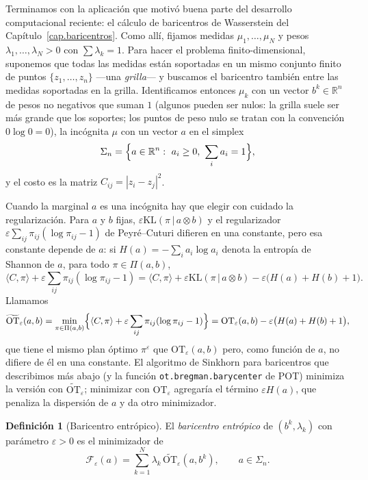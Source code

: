 \documentclass[12pt, a4paper]{amsbook}
\newcommand{\R}{{\mathbb R}}
\theoremstyle{remark}
\theoremstyle{definition}
\newtheorem{defi}[teo]{Definición}
\numberwithin{section}{chapter}
\numberwithin{subsection}{section}
\numberwithin{equation}{section}
\numberwithin{figure}{chapter}
\begin{document}
Terminamos con la aplicación que motivó buena parte del desarrollo
computacional reciente: el cálculo de baricentros de Wasserstein del
Capítulo~\ref{cap.baricentros}. Como allí, fijamos medidas $\mu_1,\dots,\mu_N$
y pesos $\lambda_1,\dots,\lambda_N>0$ con $\sum\lambda_k=1$. Para hacer el
problema finito-dimensional, suponemos que todas las medidas están
soportadas en un mismo conjunto finito de puntos $\{z_1,\dots,z_n\}$ —una
\emph{grilla}— y buscamos el baricentro también entre las medidas soportadas
en la grilla. Identificamos entonces $\mu_k$ con un vector $b^k\in\R^n$
de pesos no negativos que suman $1$ (algunos pueden ser nulos: la grilla
suele ser más grande que los soportes; los puntos de peso nulo se tratan
con la convención $0\log0=0$), la incógnita $\mu$ con un vector $a$ en el simplex
\[
\Sigma_n=\Bigl\{a\in\R^n:\ a_i\ge0,\ \sum_ia_i=1\Bigr\},
\]
y el costo es la matriz $C_{ij}=|z_i-z_j|^2$.

Cuando la marginal $a$ es una incógnita hay que elegir con cuidado la
regularización. Para $a$ y $b$ fijas, $\varepsilon\mathrm{KL}(\pi\,|\,a\otimes b)$
y el regularizador $\varepsilon\sum_{ij}\pi_{ij}(\log\pi_{ij}-1)$ de
Peyré--Cuturi difieren en una constante, pero esa constante depende de $a$:
si $H(a)=-\sum_ia_i\log a_i$ denota la entropía de Shannon de $a$, para todo
$\pi\in\Pi(a,b)$,
\[
\langle C,\pi\rangle+\varepsilon\sum_{ij}\pi_{ij}(\log\pi_{ij}-1)
=\langle C,\pi\rangle+\varepsilon\mathrm{KL}(\pi\,|\,a\otimes b)
-\varepsilon\bigl(H(a)+H(b)+1\bigr).
\]
Llamamos
\[
\widetilde{\mathrm{OT}}_\varepsilon(a,b)
=\min_{\pi\in\Pi(a,b)}\Bigl\{\langle C,\pi\rangle+\varepsilon\sum_{ij}\pi_{ij}(\log\pi_{ij}-1)\Bigr\}
=\mathrm{OT}_\varepsilon(a,b)-\varepsilon\bigl(H(a)+H(b)+1\bigr),
\]
que tiene el mismo plan óptimo $\pi^\varepsilon$ que $\mathrm{OT}_\varepsilon(a,b)$
pero, como función de $a$, no difiere de él en una constante. El algoritmo de
Sinkhorn para baricentros que describimos más abajo (y la función
\texttt{ot.bregman.barycenter} de POT) minimiza la versión con
$\widetilde{\mathrm{OT}}_\varepsilon$; minimizar con $\mathrm{OT}_\varepsilon$
agregaría el término $\varepsilon H(a)$, que penaliza la dispersión de $a$ y
da otro minimizador.

\begin{defi}[Baricentro entrópico]\label{def.baricentro.entropico}
El \emph{baricentro entrópico} de $(b^k,\lambda_k)$ con parámetro
$\varepsilon>0$ es el minimizador de
\[
\mathcal F_\varepsilon(a)=\sum_{k=1}^N\lambda_k\,\widetilde{\mathrm{OT}}_\varepsilon(a,b^k),
\qquad a\in\Sigma_n.
\]
\end{defi}
\end{document}
